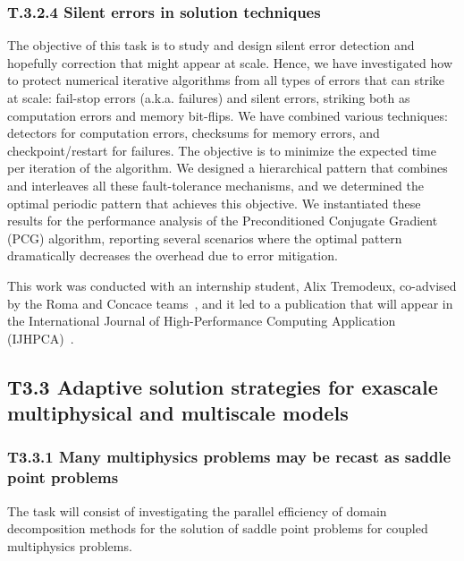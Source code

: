 

\subsubsection{ 
T.3.2.4 Silent errors in solution techniques
}
 The objective of this task is to study and design silent
error detection and hopefully correction that might appear at scale.  
Hence, we have investigated how to protect numerical iterative algorithms from all types of errors that can strike at scale: fail-stop errors (a.k.a. failures) and silent errors, striking both as computation errors
 and memory bit-flips. We have combined various techniques: detectors for computation errors,
  checksums for memory errors,  and checkpoint/restart for failures.  The objective is to minimize the expected time per iteration of the algorithm. We designed a hierarchical pattern that combines and interleaves all these fault-tolerance mechanisms, and we determined
  the optimal periodic pattern that achieves this objective. We instantiated these results for the performance analysis of the Preconditioned Conjugate Gradient (PCG) algorithm, reporting several scenarios where the optimal pattern dramatically decreases the overhead due to error mitigation.

  This work was conducted with an internship student, Alix Tremodeux, co-advised by the Roma and Concace teams~\cite{tremodeux:hal-04872041}, and it led to a publication that will appear in the International Journal of High-Performance Computing Application (IJHPCA)~\cite{tremodeux:hal-05234063}.

 
 \subsection{ 
T3.3 Adaptive solution strategies for exascale multiphysical and multiscale models
 }

\subsubsection{ 
 T3.3.1 Many multiphysics problems may be recast as saddle point problems
 }
  The task will consist of investigating the parallel efficiency of domain decomposition methods for the solution of saddle point problems for coupled multiphysics problems.


